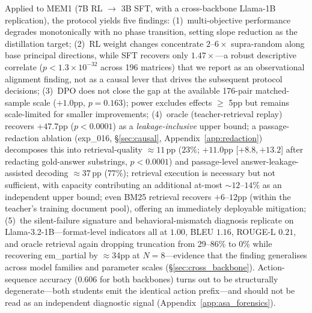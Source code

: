 Applied to MEM1 (7B RL $\to$ 3B SFT, with a cross-backbone Llama-1B replication), the protocol yields five findings: (1)~multi-objective performance degrades monotonically with no phase transition, setting slope reduction as the distillation target; (2)~RL weight changes concentrate $2$--$6\times$ supra-random along base principal directions, while SFT recovers only $1.47\times$---a robust descriptive correlate ($p < 1.3 \times 10^{-32}$ across 196 matrices) that we report as an observational alignment finding, not as a causal lever that drives the subsequent protocol decisions; (3)~DPO does not close the gap at the available 176-pair matched-sample scale ($+1.0$pp, $p=0.163$); power excludes effects $\geq$ 5pp but remains scale-limited for smaller improvements; (4)~oracle (teacher-retrieval replay) recovers $+47.7$pp ($p < 0.0001$) as a \emph{leakage-inclusive} upper bound; a passage-redaction ablation (exp\_016, \S\ref{sec:causal}, Appendix~\ref{app:redaction}) decomposes this into retrieval-quality $\approx 11$\,pp ($23\%$; $+11.0$pp [$+8.8,+13.2$] after redacting gold-answer substrings, $p<0.0001$) and passage-level answer-leakage-assisted decoding $\approx 37$\,pp ($77\%$); retrieval execution is necessary but not sufficient, with capacity contributing an additional at-most $\sim 12$--$14\%$ as an independent upper bound; even BM25 retrieval recovers $+6$--$12$pp (within the teacher's training document pool), offering an immediately deployable mitigation; (5)~the silent-failure signature and behavioral-mismatch diagnosis replicate on Llama-3.2-1B---format-level indicators all at $1.00$, BLEU $1.16$, ROUGE-L $0.21$, and oracle retrieval again dropping truncation from 29--86\% to 0\% while recovering em\_partial by $\approx$34pp at $N\!=\!8$---evidence that the finding generalises across model families and parameter scales (\S\ref{sec:cross_backbone}). Action-sequence accuracy ($0.606$ for both backbones) turns out to be structurally degenerate---both students emit the identical action prefix---and should not be read as an independent diagnostic signal (Appendix~\ref{app:asa_forensics}).
